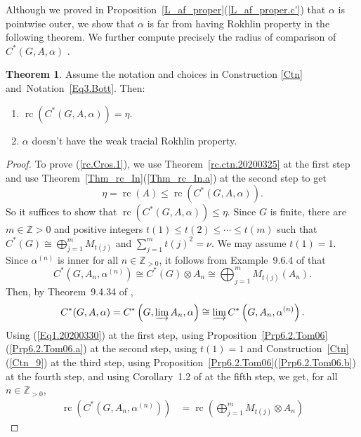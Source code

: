 \documentclass[10pt]{amsart}
\numberwithin{equation}{section}
\theoremstyle{definition}
\newtheorem{thm}{Theorem}[section]
\newcommand{\N}{{\mathbb{Z}}_{> 0}}
\newcommand{\rc}{{\operatorname{rc}}}
\newcommand{\dirlim}{\varinjlim}
\newcommand{\Ntn}[1]{Notation~\ref{#1}}
\begin{document}
%
Although we proved in Proposition~\ref{L_af_proper}(\ref{L_af_proper.c'}) that $\alpha$ is pointwise outer,
we show that $\alpha$ is far from having Rokhlin property in the following theorem.
 We further compute precisely the radius of comparison of $C^*(G, A, \alpha)$ .
\begin{thm}\label{Thm_rc_cross}
Assume the notation and choices in Construction
\ref{Ctn} and~\Ntn{Eq3.Bott}. Then:
\begin{enumerate}
\item\label{rc.Cros.1}
$\rc \left(C^*(G, A, \alpha)\right)= \eta$.
\item\label{rc.Cros.2}
$\alpha$ doesn't have the weak tracial Rokhlin property.
\end{enumerate}
\end{thm}
%
\begin{proof}
To prove (\ref{rc.Cros.1}), we use
 Theorem~{\ref{rc.ctn.20200325}} at the first step and
 use Theorem~\ref{Thm_rc_In}(\ref{Thm_rc_In.a}) 
  at the second step to get
\[
\eta = \rc (A) \leq  \rc \left(C^*(G, A, \alpha)\right).
\]
So it suffices to show that $\rc \left(C^*(G, A, \alpha)\right)\leq \eta$. 
Since $G$ is finite, there are $m \in \mathbb{Z}>0$
and positive integers $t(1)\leq t(2) \leq \cdots\leq t(m)$ 
such that 
$C^{*}(G) \cong \bigoplus_{j=1}^{m} M_{t(j)}$
 and 
$\sum_{ j=1}^{m} t(j)^{2} =\nu$. 
We may assume $t(1) = 1$.
Since $\alpha^{(n)}$ is inner for all $n \in \N$, it follows from Example~9.6.4 of \cite{GKPT18} that 
\begin{equation}\label{Eq1.20200330}
C^*\left(G, A_n, \alpha^{(n)}\right) \cong C^*(G) \otimes A_n  \cong \bigoplus_{j=1}^{m} M_{t(j)} ( A_n).
\end{equation}
Then, by Theorem~9.4.34 of \cite{GKPT18},
\begin{equation}\label{Eq1.20200427}
C^*(G, A, \alpha) 
= 
C^*\left(G, \dirlim A_n, \alpha\right)
\cong 
\dirlim C^*\left(G, A_n, \alpha^{(n)}\right).
\end{equation}
Using (\ref{Eq1.20200330}) at the first step, 
using Proposition~\ref{Prp6.2.Tom06}(\ref{Prp6.2.Tom06.a}) at the second  step, 
using $t(1)=1$ and Construction~\ref{Ctn}(\ref{Ctn_9}) at the third step,
using Proposition~\ref{Prp6.2.Tom06}(\ref{Prp6.2.Tom06.b}) at the fourth  step, and
using  Corollary~1.2 of \cite{EN13} at the fifth step,
 we get, for all $n \in \N$,
\begin{align}\label{Eq2.20200330}
\rc \left(C^*\left(G, A_n, \alpha^{(n)}\right)\right) 
&=
 \rc \left( \bigoplus_{j=1}^{m} M_{t(j)} \otimes A_n\right)

\end{align}
\end{proof}
\end{document}
